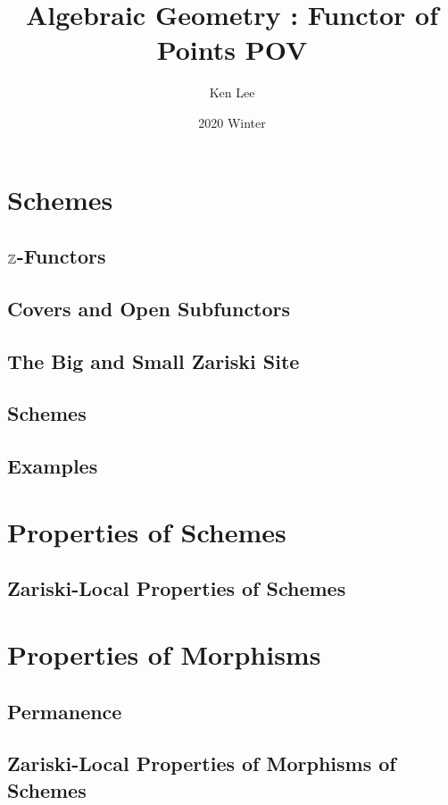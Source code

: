 \documentclass{article}
\begin{document}
\title{Algebraic Geometry : Functor of Points POV}

\author{Ken Lee}
\date{2020 Winter}
\maketitle

\tableofcontents



\newpage
\section{Schemes}
\subsection{$\mathbb{Z}$-Functors}
\subsection{Covers and Open Subfunctors}
\subsection{The Big and Small Zariski Site}
\subsection{Schemes}
\subsection{Examples}
\newpage
\section{Properties of Schemes}
\subsection{Zariski-Local Properties of Schemes}
  
\newpage
\section{Properties of Morphisms}
\subsection{Permanence}
\subsection{Zariski-Local Properties of Morphisms of Schemes}
  
\end{document}
